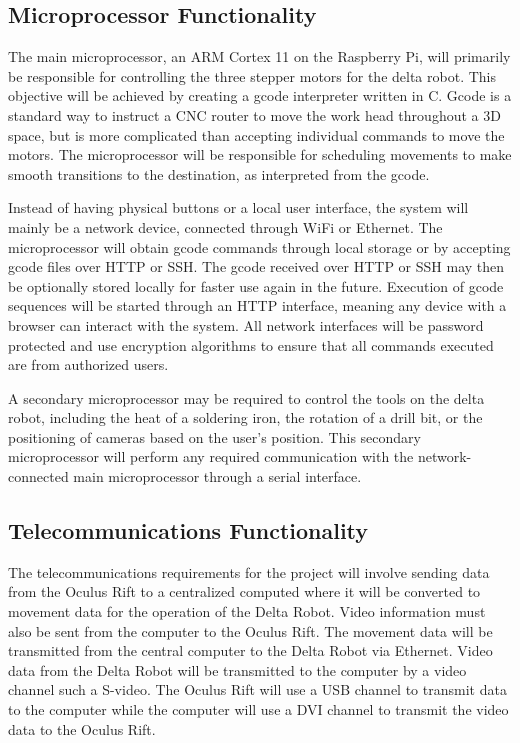 \documentclass[11pt]{report}
\begin{document}
\subsection{Microprocessor Functionality}
\par The main microprocessor, an ARM Cortex 11 on the Raspberry Pi, will primarily be responsible for controlling the three stepper motors for the delta robot. This objective will be achieved by creating a gcode interpreter written in C. Gcode is a standard way to instruct a CNC router to move the work head throughout a 3D space, but is more complicated than accepting individual commands to move the motors. The microprocessor will be responsible for scheduling movements to make smooth transitions to the destination, as interpreted from the gcode. 
\par Instead of having physical buttons or a local user interface, the system will mainly be a network device, connected through WiFi or Ethernet. The microprocessor will obtain gcode commands through local storage or by accepting gcode files over HTTP or SSH. The gcode received over HTTP or SSH may then be optionally stored locally for faster use again in the future. Execution of gcode sequences will be started through an HTTP interface, meaning any device with a browser can interact with the system. All network interfaces will be password protected and use encryption algorithms to ensure that all commands executed are from authorized users. 

\par A secondary microprocessor may be required to control the tools on the delta robot, including the heat of a soldering iron, the rotation of a drill bit, or the positioning of cameras based on the user's position. This secondary microprocessor will perform any required communication with the network-connected main microprocessor through a serial interface. 

\subsection{Telecommunications Functionality}
\par The telecommunications requirements for the project will involve sending data from the Oculus Rift to a centralized computed where it will be converted to movement data for the operation of the Delta Robot. Video information must also be sent from the computer to the Oculus Rift. The movement data will be transmitted from the central computer to the Delta Robot via Ethernet. Video data from the Delta Robot will be transmitted to the computer by a video channel such a S-video. The Oculus Rift will use a USB channel to transmit data to the computer while the computer will use a DVI channel to transmit the video data to the Oculus Rift.
\end{document}
